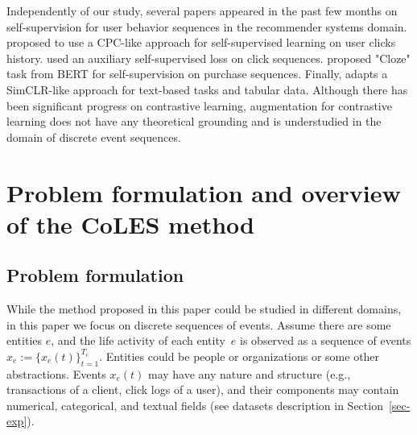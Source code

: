 \documentclass[sigconf]{acmart}
\newcommand{\R}{\mathbb{R}}
\begin{document}
Independently of our study, several papers appeared in the past few months on self-supervision for user behavior sequences in the recommender systems domain. \cite{Zhou2020ContrastiveLF} proposed to use a CPC-like approach for self-supervised learning on user clicks history. \cite{Ma2020DisentangledSI} used an auxiliary self-supervised loss on click sequences. \cite{Zhou2020S3RecSL} proposed "Cloze" task from BERT \citep{Devlin2019BERTPO} for self-supervision on purchase sequences. Finally, \cite{Yao2020SelfsupervisedLF} adapts a SimCLR-like approach for text-based tasks and tabular data. Although there has been significant progress on contrastive learning, augmentation for contrastive learning does not have any theoretical grounding and is understudied in the domain of discrete event sequences.


\section{Problem formulation and overview of the CoLES method} \label{sec-method}

\subsection{Problem formulation} \label{sec:problem setting}

While the method proposed in this paper could be studied in different domains, in this paper we focus on discrete sequences of events. Assume there are some entities $e$, and the life activity of each entity~$e$ is observed as a sequence of events $x_e:=\{x_e(t)\}^{T_e}_{t=1}$. Entities could be people or organizations or some other abstractions. Events $x_e(t)$ may have any nature and structure (e.g., transactions of a client, click logs of a user), and their components may contain numerical, categorical, and textual fields (see datasets description in Section~\ref{sec-exp}). 
\end{document}
